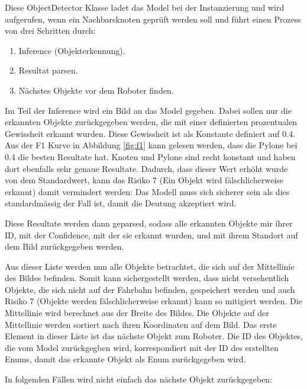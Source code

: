 Diese ObjectDetector Klasse ladet das Model bei der Instanzierung und wird aufgerufen, wenn ein Nachbarsknoten geprüft werden soll und führt einen Prozess von drei Schritten durch:

\begin{enumerate}
    \item Inference (Objekterkennung).
    \item Resultat parsen.
    \item Nächstes Objekte vor dem Roboter finden.
\end{enumerate}

Im Teil der Inference wird ein Bild an das Model gegeben. Dabei sollen nur die erkannten Objekte zurückgegeben werden, die mit einer definierten prozentualen Gewissheit erkannt wurden. Diese Gewissheit ist als Konstante definiert auf 0.4. Aus der F1 Kurve in Abbildung \ref{fig:f1} kann gelesen werden, dass die Pylone bei 0.4 die besten Resultate hat. Knoten und Pylone sind recht konstant und haben dort ebenfalls sehr genaue Resultate. Dadurch, dass dieser Wert erhöht wurde von dem Standardwert, kann das Risiko 7 (Ein Objekt wird fälschlicherweise erkannt) damit vermindert werden: Das Modell muss sich sicherer sein als dies standardmässig der Fall ist, damit die Deutung akzeptiert wird.

Diese Resultate werden dann geparsed, sodass alle erkannten Objekte mir ihrer ID, mit der Confidence, mit der sie erkannt wurden, und mit ihrem Standort auf dem Bild zurückgegeben werden.

Aus dieser Liste werden nun alle Objekte betrachtet, die sich auf der Mittellinie des Bildes befinden. Somit kann sichergestellt werden, dass nicht versehentlich Objekte, die sich nicht auf der Fahrbahn befinden, gespeichert werden und auch Risiko 7 (Objekte werden fälschlicherweise erkannt) kann so mitigiert werden. Die Mittellinie wird berechnet aus der Breite des Bildes. Die Objekte auf der Mittellinie werden sortiert nach ihren Koordinaten auf dem Bild. Das erste Element in dieser Liste ist das nächste Objekt zum Roboter. Die ID des Objektes, die vom Model zurückgegben wird, korrespondiert mit der ID des erstellten Enums, damit das erkannte Objekt als Enum zurückgegeben wird.

In folgenden Fällen wird nicht einfach das nächste Objekt zurückgegeben:

